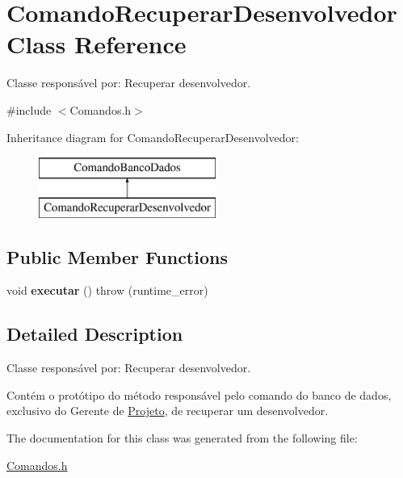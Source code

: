 \hypertarget{class_comando_recuperar_desenvolvedor}{}\section{Comando\+Recuperar\+Desenvolvedor Class Reference}
\label{class_comando_recuperar_desenvolvedor}


Classe responsável por\+: Recuperar desenvolvedor.  




{\ttfamily \#include $<$Comandos.\+h$>$}

Inheritance diagram for Comando\+Recuperar\+Desenvolvedor\+:\begin{figure}[H]
\begin{center}
\leavevmode
\includegraphics[height=2.000000cm]{class_comando_recuperar_desenvolvedor}
\end{center}
\end{figure}
\subsection*{Public Member Functions}
\begin{DoxyCompactItemize}
\item 
\hypertarget{class_comando_recuperar_desenvolvedor_ac42fbc8663e45bdad2988e9a8e636938}{}\label{class_comando_recuperar_desenvolvedor_ac42fbc8663e45bdad2988e9a8e636938} 
void {\bfseries executar} ()  throw (runtime\+\_\+error)
\end{DoxyCompactItemize}


\subsection{Detailed Description}
Classe responsável por\+: Recuperar desenvolvedor. 

Contém o protótipo do método responsável pelo comando do banco de dados, exclusivo do Gerente de \hyperlink{class_projeto}{Projeto}, de recuperar um desenvolvedor. 

The documentation for this class was generated from the following file\+:\begin{DoxyCompactItemize}
\item 
\hyperlink{_comandos_8h}{Comandos.\+h}\end{DoxyCompactItemize}
